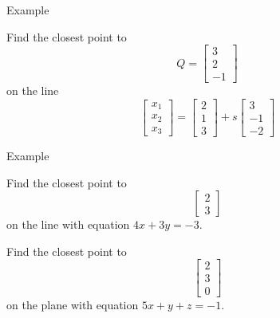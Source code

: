 \documentclass{beamer}
\begin{document}
\begin{frame}{Example}
    \begin{example}
    Find the closest point to
    \begin{equation*}
      Q=\left[
	\begin{array}{c}
          3\\
          2\\
          -1
	\end{array}
      \right]
    \end{equation*}
    on the line
    \begin{equation*}
      \left[
	\begin{array}{c}
          x_1\\
          x_2\\
          x_3
	\end{array}
      \right] = \left[
	\begin{array}{c}
          2\\
          1\\
          3
	\end{array}
      \right]+s \left[
	\begin{array}{c}
          3\\
          -1\\
          -2
	\end{array}
      \right]
    \end{equation*}
  \end{example}
\end{frame}

\begin{frame}{Example}
    \begin{example}
        Find the closest point to
        \begin{equation*}
          \left[
        \begin{array}{c}
              2\\
              3
        \end{array}
          \right]
        \end{equation*}
        on the line with equation $4x+3y = -3$.
      \end{example}
    \begin{example}
    Find the closest point to
    \begin{equation*}
      \left[
	\begin{array}{c}
          2\\
          3\\
          0
	\end{array}
      \right]
    \end{equation*}
    on the plane with equation $5x+y+z = -1$.
  \end{example}
\end{frame}
\end{document}
